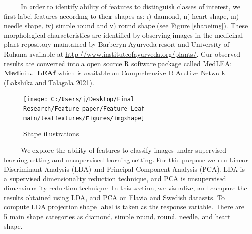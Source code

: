 \documentclass{article}
\begin{document}
~~~~~In order to identify ability of features to distinguish classes of
interest, we first label features according to their shapes as: i)
diamond, ii) heart shape, iii) needle shape, iv) simple round and v)
round shape (see Figure \ref{shapeimg}). These morphological
characteristics are identified by observing images in the medicinal
plant repository maintained by Barberyn Ayurveda resort and University
of Ruhuna available at \url{http://www.instituteofayurveda.org/plants/}.
Our observed results are converted into a open source R software package
called MedLEA: \textbf{Med}icinal \textbf{LEAf} which is available on
Comprehensive R Archive Network (Lakshika and Talagala 2021).

\begin{figure}[!ht]

{\centering \texttt{[image: C:/Users/j/Desktop/Final Research/Feature\_paper/Feature-Leaf-main/leaffeatures/Figures/imgshape]} 

}

\caption{\label{shapeimg}Shape illustrations}\label{fig:unnamed-chunk-39}
\end{figure}

~~~~~We explore the ability of features to classify images under
supervised learning setting and unsupervised learning setting. For this
purpose we use Linear Discriminant Analysis (LDA) and Principal
Component Analysis (PCA). LDA is a supervised dimensionality reduction
technique, and PCA is unsupervised dimensionality reduction technique.
In this section, we visualize, and compare the results obtained using
LDA, and PCA on Flavia and Swedish datasets. To compute LDA projection
shape label is taken as the response variable. There are 5 main shape
categories as diamond, simple round, round, needle, and heart shape.
\end{document}

